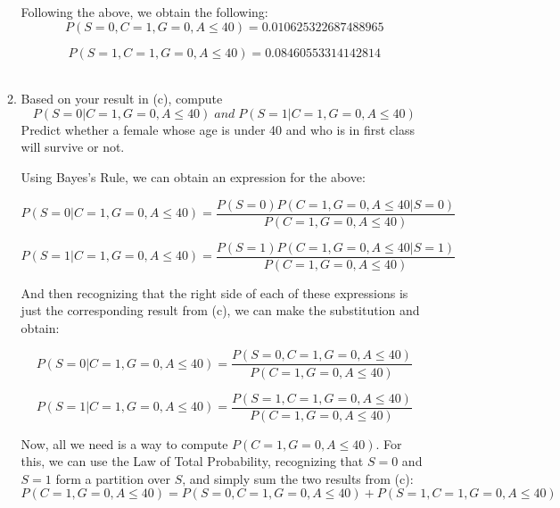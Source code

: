 \documentclass[]{article}
\begin{document}
\begin{enumerate}
\begin{enumerate}
\begin{lstlisting}
    		\end{lstlisting} 
    	
    		Following the above, we obtain the following:\\
    		
    		\[
    		P(S=0,C=1,G=0,A\leq40) = 0.010625322687488965
    		\]
    		
    		\[
    		P(S=1,C=1,G=0,A\leq40) = 0.08460553314142814
    		\]\\
    	 		
    		\item Based on your result in (c), compute 
    		\[
    		P(S= 0|C= 1,G= 0,A\leq40) \; and \; P(S=1|C= 1,G= 0,A\leq40)
    		\]
    		Predict whether a female whose age is under 40 and who is in first class will survive or not.
    		
    		
    		Using Bayes's Rule, we can obtain an expression for the above:
    		
    		\begin{equation}
    			P(S= 0|C= 1,G= 0,A\leq40) = \frac{P(S=0)P(C=1,G=0,A\leq40|S=0)}{P(C=1, G=0,A \leq 40)}
    		\end{equation}

    		\begin{equation}
    			P(S=1|C= 1,G= 0,A\leq40) = \frac{P(S=1)P(C=1,G=0,A\leq40|S=1)}{P(C=1, G=0,A \leq 40)}
    		\end{equation}
    	
    		And then recognizing that the right side of each of these expressions is just the corresponding result from (c), we can make the substitution and obtain:
    		
    		\begin{equation}
    			P(S= 0|C= 1,G= 0,A\leq40) = \frac{P(S=0,C=1,G=0,A\leq40)}{P(C=1, G=0,A \leq 40)}
    		\end{equation}
    		
    		\begin{equation}
    			P(S=1|C= 1,G= 0,A\leq40) = \frac{P(S=1,C=1,G=0,A\leq40)}{P(C=1, G=0,A \leq 40)}
    		\end{equation}
    		
    		Now, all we need is a way to compute $P(C=1, G=0,A \leq 40)$. For this, we can use the Law of Total Probability, recognizing that $S=0$ and $S=1$ form a partition over $S$, and simply sum the two results from (c):
    		\begin{equation}
    			P(C=1, G=0,A \leq 40) = P(S=0,C=1,G=0,A\leq40) + P(S=1,C=1,G=0,A\leq40)
    		\end{equation}
    	

\end{enumerate}
\end{enumerate}
\end{document}
